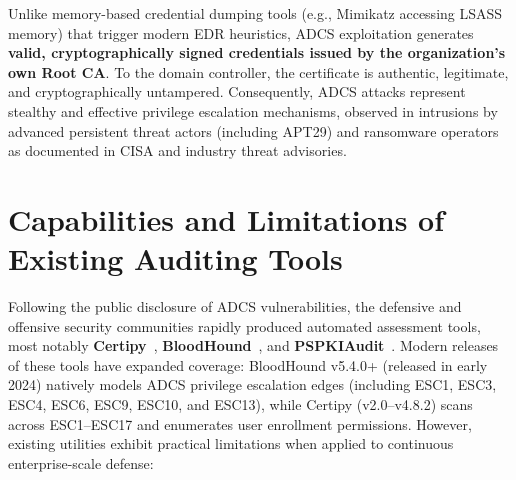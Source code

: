 Unlike memory-based credential dumping tools (e.g., Mimikatz accessing LSASS memory) that trigger modern EDR heuristics, ADCS exploitation generates \textbf{valid, cryptographically signed credentials issued by the organization's own Root CA}. To the domain controller, the certificate is authentic, legitimate, and cryptographically untampered. Consequently, ADCS attacks represent stealthy and effective privilege escalation mechanisms, observed in intrusions by advanced persistent threat actors (including APT29) and ransomware operators as documented in CISA and industry threat advisories.

\section{Capabilities and Limitations of Existing Auditing Tools}
Following the public disclosure of ADCS vulnerabilities, the defensive and offensive security communities rapidly produced automated assessment tools, most notably \textbf{Certipy}~\cite{lyak2021certipy}, \textbf{BloodHound}~\cite{robbins2017bloodhound}, and \textbf{PSPKIAudit}~\cite{pspkiaudit}. Modern releases of these tools have expanded coverage: BloodHound v5.4.0+ (released in early 2024) natively models ADCS privilege escalation edges (including ESC1, ESC3, ESC4, ESC6, ESC9, ESC10, and ESC13), while Certipy (v2.0--v4.8.2) scans across ESC1--ESC17 and enumerates user enrollment permissions. However, existing utilities exhibit practical limitations when applied to continuous enterprise-scale defense:

